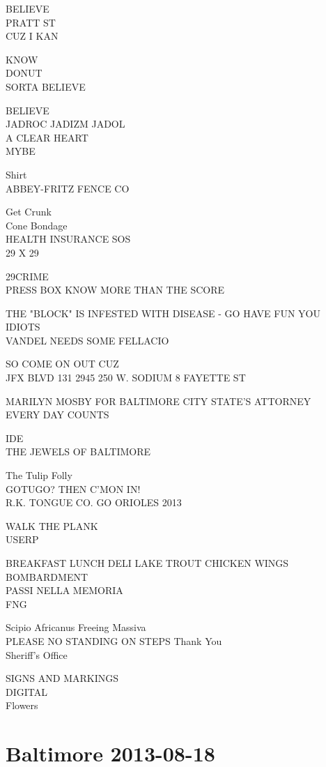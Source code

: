 \documentclass[10pt,letterpaper]{article}
\begin{document}
BELIEVE\\
PRATT ST\\
CUZ I KAN

KNOW\\
DONUT\\
SORTA BELIEVE

BELIEVE\\
JADROC JADIZM JADOL\\
A CLEAR HEART\\
MYBE

Shirt\\
ABBEY{-}FRITZ FENCE CO

Get Crunk\\
Cone Bondage\\
HEALTH INSURANCE SOS\\
29 X 29

29CRIME\\
PRESS BOX KNOW MORE THAN THE SCORE

THE "BLOCK" IS INFESTED WITH DISEASE {-} GO HAVE FUN YOU IDIOTS\\
VANDEL NEEDS SOME FELLACIO

SO COME ON OUT CUZ\\
JFX BLVD 131 2945 250 W. SODIUM 8 FAYETTE ST

MARILYN MOSBY FOR BALTIMORE CITY STATE'S ATTORNEY\\
EVERY DAY COUNTS

IDE\\
THE JEWELS OF BALTIMORE

The Tulip Folly\\
GOTUGO? THEN C'MON IN!\\
R.K. TONGUE CO. GO ORIOLES 2013

WALK THE PLANK\\
USERP

BREAKFAST LUNCH DELI LAKE TROUT CHICKEN WINGS\\
BOMBARDMENT\\
PASSI NELLA MEMORIA\\
FNG

Scipio Africanus Freeing Massiva\\
PLEASE NO STANDING ON STEPS Thank You\\
Sheriff's Office

SIGNS AND MARKINGS\\
DIGITAL\\
Flowers
\pagebreak

\section*{Baltimore 2013-08-18}
\end{document}
